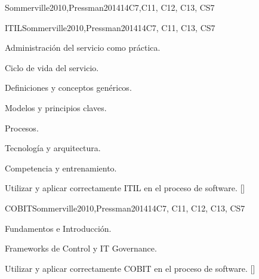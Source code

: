 \begin{syllabus}
\begin{unit}{\SESoftwareProjectManagement}{}{Sommerville2010,Pressman2014}{14}{C7,C11, C12, C13, CS7}
\begin{learningoutcomes}
    \item \SESoftwareProjectManagementLOTrack [\Usage]
    \item \SESoftwareProjectManagementLOCompareSimple [\Usage]
    \item \SESoftwareProjectManagementLOUseATool [\Usage]
    \item \SESoftwareProjectManagementLODescribeTheRiskThe [\Usage]
    \item \SESoftwareProjectManagementLOIdentifyRisks [\Usage]
    \item \SESoftwareProjectManagementLOExplainHowDecisions [\Usage]
    \item \SESoftwareProjectManagementLOIdentifySecurity [\Usage]
    \item \SESoftwareProjectManagementLODemonstrateA [\Usage]
    \item \SESoftwareProjectManagementLOApplyTheOf [\Usage]
    \item \SESoftwareProjectManagementLOConductAAnalysis [\Usage]
    \item \SESoftwareProjectManagementLOIdentifyAndOfFor [\Usage]
\end{learningoutcomes}
\end{unit}

\begin{unit}{}{ITIL}{Sommerville2010,Pressman2014}{14}{C7, C11, C13, CS7}
\begin{topics}
    \item Administración del servicio como práctica.
    \item Ciclo de vida del servicio.
    \item Definiciones y conceptos genéricos.
    \item Modelos y principios claves.
    \item Procesos.
    \item Tecnología y arquitectura.
    \item Competencia y entrenamiento.
\end{topics}
\begin{learningoutcomes}
  \item Utilizar y aplicar correctamente ITIL en el proceso de software. [\Usage]
\end{learningoutcomes}
\end{unit}

\begin{unit}{}{COBIT}{Sommerville2010,Pressman2014}{14}{C7, C11, C12, C13, CS7}
\begin{topics}
    \item Fundamentos e Introducción.
    \item Frameworks de Control y IT Governance.
\end{topics}
\begin{learningoutcomes}
\item Utilizar y aplicar correctamente COBIT en el proceso de software. [\Usage]	
\end{learningoutcomes}
\end{unit}







\end{syllabus}
